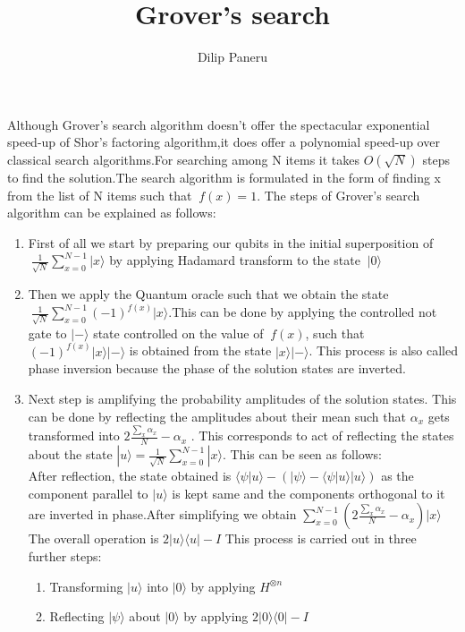 \documentclass[a4,12pt]{article}
\begin{document}
\author{Dilip Paneru}
\date{}
\title{Grover's search}
\maketitle
Although Grover's search algorithm doesn't offer the spectacular exponential speed-up of Shor's factoring algorithm,it does offer a polynomial speed-up over classical search algorithms.For searching among N items it takes $O(\sqrt{N})$ steps to find the solution.The search algorithm is formulated in the form of finding x from the list of N items such that $\ f(x)=1$. The steps of Grover's search algorithm can be explained as follows:
\begin{enumerate}
\item First of all we start by preparing our qubits in the initial superposition of $\ \frac{1}{\sqrt{N}} \sum_{x=0}^{N-1}|x\rangle$   by applying Hadamard transform to the state  $\ |0\rangle $
\item Then we apply the Quantum oracle such that we obtain the state $\ \frac{1}{\sqrt{N}} \sum_{x=0}^{N-1}(-1)^{f(x)}|x\rangle$.This can be done by applying the controlled not gate to $|-\rangle$ state controlled on the value of $\ f(x)$, such that $(-1)^{f(x)}|x\rangle|-\rangle$ is obtained from the state $|x\rangle|-\rangle$. This process is also called phase inversion because the phase of the solution states are inverted.
\item Next step is amplifying the probability amplitudes of the solution states. This can be done by reflecting the amplitudes about their mean such that $ \alpha_x$ gets transformed into $ 2\frac{\sum_{x}\alpha_x}{N} - \alpha_x $ . This corresponds to act of reflecting the states about the state
$ |u\rangle = \frac{1}{\sqrt{N}} \sum_{x=0}^{N-1}|x\rangle$. This can be seen as follows:
\\ After reflection, the state obtained is $\langle\psi|u\rangle-(|\psi\rangle - \langle\psi|u\rangle|u\rangle)$ as the component parallel to $|u\rangle$ is kept same and the components orthogonal to it are inverted in phase.After simplifying we obtain $   \sum_{x=0}^{N-1}(2\frac{\sum_{x}\alpha_x}{N}-\alpha_x)|x\rangle$ 
The overall operation is $2|u\rangle \langle u|-I$
This process is carried out in three further steps:
\begin{enumerate}
	\item Transforming $|u\rangle$ into $|0\rangle$ by applying $H^{\otimes n}$
	\item Reflecting $|\psi\rangle$ about $|0\rangle$ by applying $2|0\rangle \langle 0|-I$

\end{enumerate}
\end{enumerate}
\end{document}
